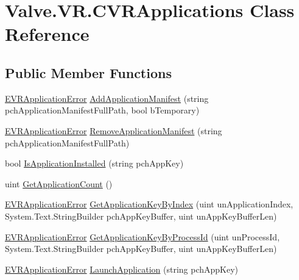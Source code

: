 \hypertarget{class_valve_1_1_v_r_1_1_c_v_r_applications}{}\section{Valve.\+V\+R.\+C\+V\+R\+Applications Class Reference}
\label{class_valve_1_1_v_r_1_1_c_v_r_applications}
\subsection*{Public Member Functions}
\begin{DoxyCompactItemize}
\item 
\mbox{\hyperlink{namespace_valve_1_1_v_r_a3488adab8a219b579fcee50f4e63a8b6}{E\+V\+R\+Application\+Error}} \mbox{\hyperlink{class_valve_1_1_v_r_1_1_c_v_r_applications_a227ab31b106e3038d88e51fcfaa9380d}{Add\+Application\+Manifest}} (string pch\+Application\+Manifest\+Full\+Path, bool b\+Temporary)
\item 
\mbox{\hyperlink{namespace_valve_1_1_v_r_a3488adab8a219b579fcee50f4e63a8b6}{E\+V\+R\+Application\+Error}} \mbox{\hyperlink{class_valve_1_1_v_r_1_1_c_v_r_applications_a1185bc8e37e263c6963c9c59fd6b0dd9}{Remove\+Application\+Manifest}} (string pch\+Application\+Manifest\+Full\+Path)
\item 
bool \mbox{\hyperlink{class_valve_1_1_v_r_1_1_c_v_r_applications_a85a594e9e20b45a193d9145f0243eb00}{Is\+Application\+Installed}} (string pch\+App\+Key)
\item 
uint \mbox{\hyperlink{class_valve_1_1_v_r_1_1_c_v_r_applications_a257f814362d6c86e93a3645f689daad5}{Get\+Application\+Count}} ()
\item 
\mbox{\hyperlink{namespace_valve_1_1_v_r_a3488adab8a219b579fcee50f4e63a8b6}{E\+V\+R\+Application\+Error}} \mbox{\hyperlink{class_valve_1_1_v_r_1_1_c_v_r_applications_a796a099a422f00861a3c8190494e4b29}{Get\+Application\+Key\+By\+Index}} (uint un\+Application\+Index, System.\+Text.\+String\+Builder pch\+App\+Key\+Buffer, uint un\+App\+Key\+Buffer\+Len)
\item 
\mbox{\hyperlink{namespace_valve_1_1_v_r_a3488adab8a219b579fcee50f4e63a8b6}{E\+V\+R\+Application\+Error}} \mbox{\hyperlink{class_valve_1_1_v_r_1_1_c_v_r_applications_a426c0a54264e05dc34a9e82d8922e451}{Get\+Application\+Key\+By\+Process\+Id}} (uint un\+Process\+Id, System.\+Text.\+String\+Builder pch\+App\+Key\+Buffer, uint un\+App\+Key\+Buffer\+Len)
\item 
\mbox{\hyperlink{namespace_valve_1_1_v_r_a3488adab8a219b579fcee50f4e63a8b6}{E\+V\+R\+Application\+Error}} \mbox{\hyperlink{class_valve_1_1_v_r_1_1_c_v_r_applications_aa6792921394b584d65f6782cae386469}{Launch\+Application}} (string pch\+App\+Key)

\end{DoxyCompactItemize}
